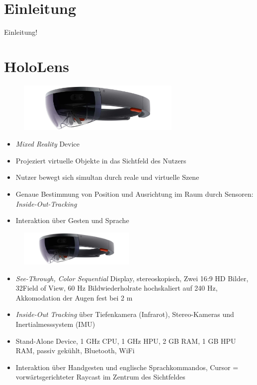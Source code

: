 \part{Einleitung}
\label{part:intro}

\begin{frame}[fragile]{}
Einleitung!
\end{frame}

\part{HoloLens}
\label{part:hololens}
\begin{frame}[fragile]{}
\begin{figure}[h!]
	\centering
	\includegraphics[width=0.7\textwidth]{images/hololens.jpg}
\end{figure}
\begin{itemize}
	\pause
	\item \textit{Mixed Reality} Device
	\pause
	\item Projeziert virtuelle Objekte in das Sichtfeld des Nutzers
	\pause
	\item Nutzer bewegt sich simultan durch reale und virtuelle Szene
	\pause
	\item Genaue Bestimmung von Position und Ausrichtung im Raum durch Sensoren: \textit{Inside-Out-Tracking}
	\pause
	\item Interaktion über Gesten und Sprache
\end{itemize}	
\end{frame}

\begin{frame}[fragile]{}
\begin{figure}[h!]
	\centering
	\includegraphics[width=0.5\textwidth]{images/hololens.jpg}
\end{figure}
\begin{itemize}
	\pause
	\item \textit{See-Through, Color Sequential} Display, stereoskopisch, Zwei 16:9 HD Bilder, 32\degree Field of View, 60 Hz Bildwiederholrate hochskaliert auf 240 Hz, Akkomodation der Augen fest bei 2 m
	\pause
	\item \textit{Inside-Out Tracking} über Tiefenkamera (Infrarot), Stereo-Kameras und Inertialmesssystem (IMU)
	\pause
	\item Stand-Alone Device, 1 GHz CPU, 1 GHz HPU, 2 GB RAM, 1 GB HPU RAM, passiv gekühlt, Bluetooth, WiFi
	\pause
	\item Interaktion über Handgesten und englische Sprachkommandos, Cursor = vorwärtsgerichteter Raycast im Zentrum des Sichtfeldes
\end{itemize}	
\end{frame}

